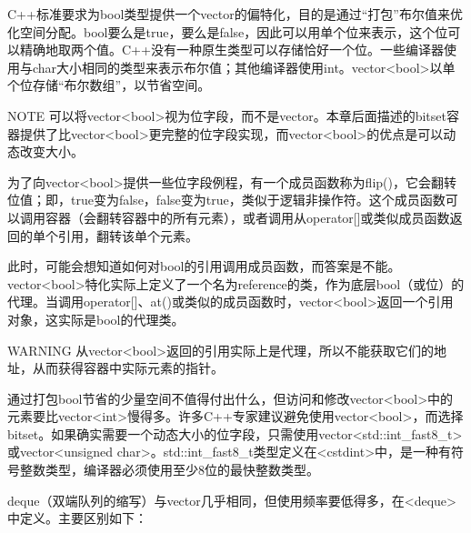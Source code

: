 
C++标准要求为bool类型提供一个vector的偏特化，目的是通过“打包”布尔值来优化空间分配。bool要么是true，要么是false，因此可以用单个位来表示，这个位可以精确地取两个值。C++没有一种原生类型可以存储恰好一个位。一些编译器使用与char大小相同的类型来表示布尔值；其他编译器使用int。vector<bool>以单个位存储“布尔数组”，以节省空间。

\begin{myNotic}{NOTE}
可以将vector<bool>视为位字段，而不是vector。本章后面描述的bitset容器提供了比vector<bool>更完整的位字段实现，而vector<bool>的优点是可以动态改变大小。
\end{myNotic}

为了向vector<bool>提供一些位字段例程，有一个成员函数称为flip()，它会翻转位值；即，true变为false，false变为true，类似于逻辑非操作符。这个成员函数可以调用容器（会翻转容器中的所有元素），或者调用从operator[]或类似成员函数返回的单个引用，翻转该单个元素。

此时，可能会想知道如何对bool的引用调用成员函数，而答案是不能。vector<bool>特化实际上定义了一个名为reference的类，作为底层bool（或位）的代理。当调用operator[]、at()或类似的成员函数时，vector<bool>返回一个引用对象，这实际是bool的代理类。

\begin{myWarning}{WARNING}
从vector<bool>返回的引用实际上是代理，所以不能获取它们的地址，从而获得容器中实际元素的指针。
\end{myWarning}

通过打包bool节省的少量空间不值得付出什么，但访问和修改vector<bool>中的元素要比vector<int>慢得多。许多C++专家建议避免使用vector<bool>，而选择bitset。如果确实需要一个动态大小的位字段，只需使用vector<std::int\_fast8\_t>或vector<unsigned char>。std::int\_fast8\_t类型定义在<cstdint>中，是一种有符号整数类型，编译器必须使用至少8位的最快整数类型。


deque（双端队列的缩写）与vector几乎相同，但使用频率要低得多，在<deque>中定义。主要区别如下：

